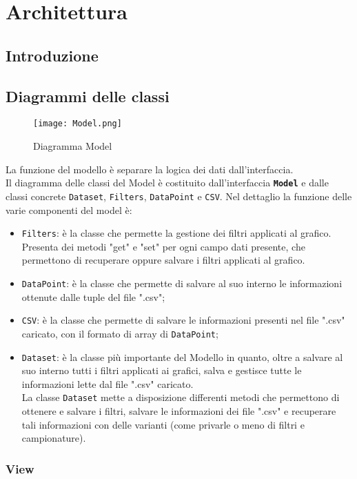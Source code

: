 \chapter{Architettura}
\section{Introduzione}

\section{Diagrammi delle classi}
\begin{figure}[ht]
	\centering
	\texttt{[image: Model.png]}
	\caption{Diagramma Model}
  \end{figure}
La funzione del modello è separare la logica dei dati dall'interfaccia.\\
Il diagramma delle classi del Model è costituito dall'interfaccia \textbf{\texttt{Model}} e dalle classi concrete \texttt{Dataset}, \texttt{Filters}, \texttt{DataPoint} e \texttt{CSV}.
Nel dettaglio la funzione delle varie componenti del model è:
\begin{itemize}
	\item \texttt{Filters}: è la classe che permette la gestione dei filtri applicati al grafico. Presenta dei metodi "get" e "set" per ogni campo dati presente, che permettono di recuperare oppure salvare i filtri applicati al grafico.
	\item \texttt{DataPoint}: è la classe che permette di salvare al suo interno le informazioni ottenute dalle tuple del file ".csv";
	\item \texttt{CSV}: è la classe che permette di salvare le informazioni presenti nel file ".csv" caricato, con il formato di array di \texttt{DataPoint};
	\item \texttt{Dataset}: è la classe più importante del Modello in quanto, oltre a salvare al suo interno tutti i filtri applicati ai grafici, salva e gestisce tutte le informazioni lette dal file ".csv" caricato.\\ La classe \texttt{Dataset} mette a disposizione differenti metodi che permettono di ottenere e salvare i filtri, salvare le informazioni dei file ".csv" e recuperare tali informazioni con delle varianti (come privarle o meno di filtri e campionature).
\end{itemize}
\subsection{View}


